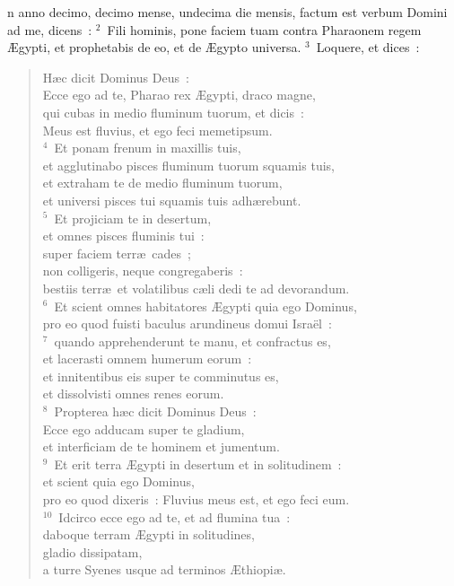\bchapter
{}n anno decimo, decimo mense, undecima die mensis, factum est verbum Domini ad me, dicens~:
${}^{2}$~Fili hominis, pone faciem tuam contra Pharaonem regem \AE gypti, et prophetabis de eo, et de \AE gypto universa.
${}^{3}$~Loquere, et dices~: \begin{flushleft}\begin{verse}H\ae c dicit Dominus Deus~:\\ Ecce ego ad te, Pharao rex \AE gypti, draco magne,\\ qui cubas in medio fluminum tuorum, et dicis~:\\ Meus est fluvius, et ego feci memetipsum.\\
${}^{4}$~Et ponam frenum in maxillis tuis,\\ et agglutinabo pisces fluminum tuorum squamis tuis,\\ et extraham te de medio fluminum tuorum,\\ et universi pisces tui squamis tuis adh\ae rebunt.\\
${}^{5}$~Et projiciam te in desertum,\\ et omnes pisces fluminis tui~:\\ super faciem terr\ae\ cades~;\\ non colligeris, neque congregaberis~:\\ bestiis terr\ae\ et volatilibus c\ae li dedi te ad devorandum.\\
${}^{6}$~Et scient omnes habitatores \AE gypti quia ego Dominus,\\ pro eo quod fuisti baculus arundineus domui Isra\"el~:\\
${}^{7}$~quando apprehenderunt te manu, et confractus es,\\ et lacerasti omnem humerum eorum~:\\ et innitentibus eis super te comminutus es,\\ et dissolvisti omnes renes eorum.\\
${}^{8}$~Propterea h\ae c dicit Dominus Deus~:\\ Ecce ego adducam super te gladium,\\ et interficiam de te hominem et jumentum.\\
${}^{9}$~Et erit terra \AE gypti in desertum et in solitudinem~:\\ et scient quia ego Dominus,\\ pro eo quod dixeris~: Fluvius meus est, et ego feci eum.\\
${}^{10}$~Idcirco ecce ego ad te, et ad flumina tua~:\\ daboque terram \AE gypti in solitudines,\\ gladio dissipatam,\\ a turre Syenes usque ad terminos \AE thiopi\ae .\\

\end{verse}
\end{flushleft}
